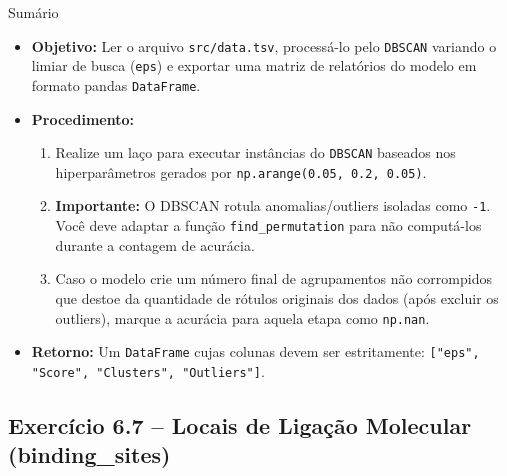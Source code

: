 \documentclass[11pt,a4paper]{article}
\begin{document}
\begin{exercicio}{Sumário}
\begin{itemize}
    \item \textbf{Objetivo:} Ler o arquivo \texttt{src/data.tsv}, processá-lo pelo \texttt{DBSCAN} variando o limiar de busca (\texttt{eps}) e exportar uma matriz de relatórios do modelo em formato pandas \texttt{DataFrame}.
    \item \textbf{Procedimento:}
    \begin{enumerate}
        \item Realize um laço para executar instâncias do \texttt{DBSCAN} baseados nos hiperparâmetros gerados por \texttt{np.arange(0.05, 0.2, 0.05)}.
        \item \textbf{Importante:} O DBSCAN rotula anomalias/outliers isoladas como \texttt{-1}. Você deve adaptar a função \texttt{find\_permutation} para não computá-los durante a contagem de acurácia.
        \item Caso o modelo crie um número final de agrupamentos não corrompidos que destoe da quantidade de rótulos originais dos dados (após excluir os outliers), marque a acurácia para aquela etapa como \texttt{np.nan}.
    \end{enumerate}
    \item \textbf{Retorno:} Um \texttt{DataFrame} cujas colunas devem ser estritamente: \texttt{["eps", "Score", "Clusters", "Outliers"]}.
\end{itemize}
\end{exercicio}

\subsection*{Exercício 6.7 -- Locais de Ligação Molecular (binding\_sites)}
\end{document}
